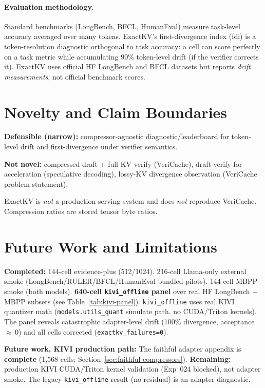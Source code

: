 \documentclass[11pt]{article}
\begin{document}
\paragraph{Evaluation methodology.}
Standard benchmarks (LongBench, BFCL, HumanEval) measure task-level accuracy
averaged over many tokens. ExactKV's first-divergence index (fdi) is a
token-resolution diagnostic orthogonal to task accuracy: a cell can score
perfectly on a task metric while accumulating 90\% token-level drift (if the
verifier corrects it). ExactKV uses official HF LongBench and BFCL datasets but
reports \emph{drift measurements}, not official benchmark scores.

\section{Novelty and Claim Boundaries}
\textbf{Defensible (narrow):} compressor-agnostic diagnostic/leaderboard for
token-level drift and first-divergence under verifier semantics.

\textbf{Not novel:} compressed draft + full-KV verify (VeriCache), draft-verify
for acceleration (speculative decoding), lossy-KV divergence observation (VeriCache
problem statement).

ExactKV is \emph{not} a production serving system and does \emph{not} reproduce
VeriCache. Compression ratios are stored tensor byte ratios.

\section{Future Work and Limitations}
\label{sec:limitations}
{\sloppy
\textbf{Completed:} 144-cell evidence-plus (512/1024). 216-cell Llama-only external
smoke (LongBench/RULER/BFCL/HumanEval bundled pilots). 144-cell MBPP smoke (both models). \textbf{640-cell \texttt{kivi\_offline} panel} over real HF LongBench + MBPP subsets
(see Table~\ref{tab:kivi-panel}). \texttt{kivi\_offline} uses real KIVI quantizer math
(\texttt{models.utils\_quant} simulate path. no CUDA/Triton kernels). The panel
reveals catastrophic adapter-level drift (100\% divergence, acceptance $\approx$\,0)
and all cells corrected (\texttt{exactkv\_failures=0}).

\textbf{Future work, KIVI production path:} The faithful adapter appendix is
\textbf{complete} (1,568 cells; Section~\ref{sec:faithful-compressors}). \textbf{Remaining:}
production KIVI CUDA/Triton kernel validation (Exp~024 blocked), not adapter smoke.
The legacy \texttt{kivi\_offline} result (no residual) is an adapter diagnostic.
\par}
\end{document}

